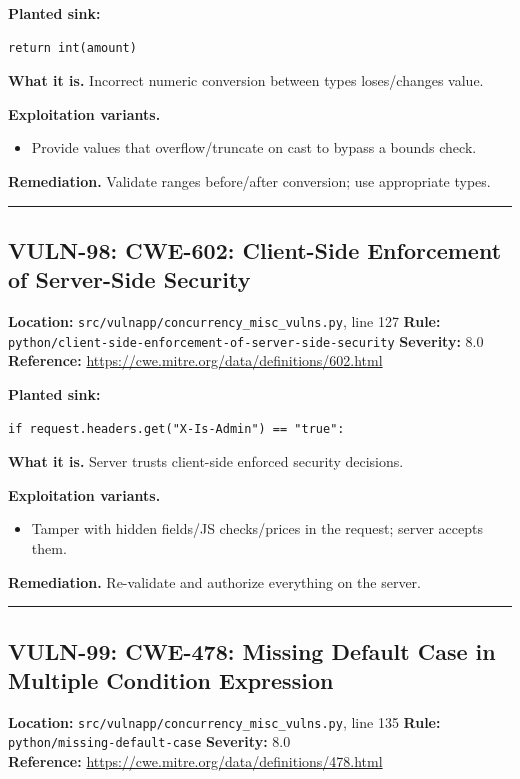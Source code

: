 \documentclass[11pt,a4paper]{article}
\begin{document}
\noindent\textbf{Planted sink:}
\begin{lstlisting}
return int(amount)
\end{lstlisting}
\noindent\textbf{What it is.} Incorrect numeric conversion between types loses/changes value.

\noindent\textbf{Exploitation variants.}
\begin{itemize}[leftmargin=1.4em,itemsep=1pt,topsep=2pt]
\item Provide values that overflow/truncate on cast to bypass a bounds check.
\end{itemize}
\noindent\textbf{Remediation.} Validate ranges before/after conversion; use appropriate types.

\vspace{4pt}\hrule\vspace{6pt}
\subsection{VULN-98: CWE-602: Client-Side Enforcement of Server-Side Security}
\noindent\textbf{Location:} \texttt{src/vulnapp/concurrency\_misc\_vulns.py}, line 127 \quad \textbf{Rule:} \texttt{python/client-side-enforcement-of-server-side-security} \quad \textbf{Severity:} 8.0
\\ \textbf{Reference:} \url{https://cwe.mitre.org/data/definitions/602.html}

\noindent\textbf{Planted sink:}
\begin{lstlisting}
if request.headers.get("X-Is-Admin") == "true":
\end{lstlisting}
\noindent\textbf{What it is.} Server trusts client-side enforced security decisions.

\noindent\textbf{Exploitation variants.}
\begin{itemize}[leftmargin=1.4em,itemsep=1pt,topsep=2pt]
\item Tamper with hidden fields/JS checks/prices in the request; server accepts them.
\end{itemize}
\noindent\textbf{Remediation.} Re-validate and authorize everything on the server.

\vspace{4pt}\hrule\vspace{6pt}
\subsection{VULN-99: CWE-478: Missing Default Case in Multiple Condition Expression}
\noindent\textbf{Location:} \texttt{src/vulnapp/concurrency\_misc\_vulns.py}, line 135 \quad \textbf{Rule:} \texttt{python/missing-default-case} \quad \textbf{Severity:} 8.0
\\ \textbf{Reference:} \url{https://cwe.mitre.org/data/definitions/478.html}
\end{document}
